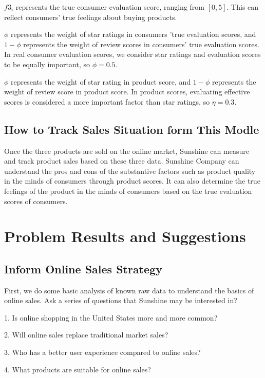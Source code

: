 \documentclass[UTF8]{article}
\begin{document}
$f3_i$ represents the true consumer evaluation score, ranging from $[0,5]$. This can reflect consumers' true feelings about buying products.

$\phi$ represents the weight of star ratings in consumers 'true evaluation scores, and $1- \phi$ represents the weight of review scores in consumers' true evaluation scores. In real consumer evaluation scores, we consider star ratings and evaluation scores to be equally important, so $\phi = 0.5$.

$\phi$ represents the weight of star rating in product score, and $1- \phi$ represents the weight of review score in product score. In product scores, evaluating effective scores is considered a more important factor than star ratings, so $\eta = 0.3$.

\subsection{How to Track Sales Situation form This Modle}

Once the three products are sold on the online market, Sunshine can measure and track product sales based on these three data. Sunshine Company can understand the pros and cons of the substantive factors such as product quality in the minds of consumers through product scores. It can also determine the true feelings of the product in the minds of consumers based on the true evaluation scores of consumers.

\section{Problem Results and Suggestions}

\subsection{Inform Online Sales Strategy}

First, we do some basic analysis of known raw data to understand the basics of online sales. Ask a series of questions that Sunshine may be interested in?

1. Is online shopping in the United States more and more common?

2. Will online sales replace traditional market sales?

3. Who has a better user experience compared to online sales?

4. What products are suitable for online sales?
\end{document}
